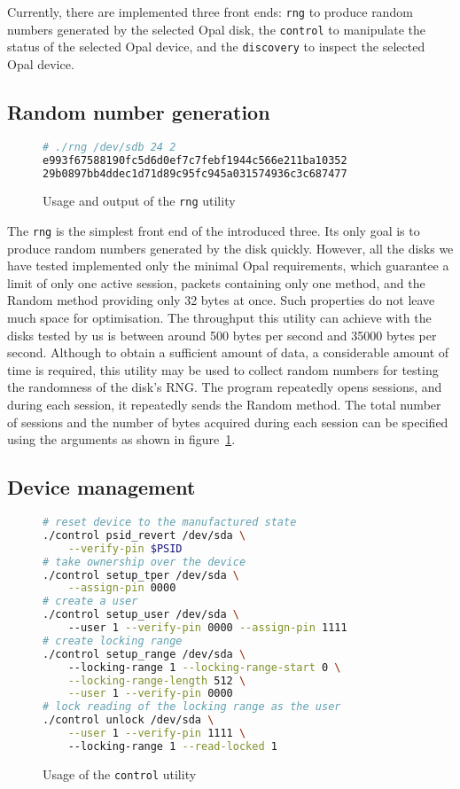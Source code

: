 Currently, there are implemented three front ends: \verb|rng| to produce random numbers generated by the selected Opal disk, the \verb|control| to manipulate the status of the selected Opal device, and the \verb|discovery| to inspect the selected Opal device.

\subsection{Random number generation}

\begin{figure}
    \centering
\begin{lstlisting}[language=Bash]
# ./rng /dev/sdb 24 2
e993f67588190fc5d6d0ef7c7febf1944c566e211ba10352
29b0897bb4ddec1d71d89c95fc945a031574936c3c687477
\end{lstlisting}
    \caption{Usage and output of the \texttt{rng} utility}
    \label{fig:rng_output}
\end{figure}

The \verb|rng| is the simplest front end of the introduced three. Its only goal is to produce random numbers generated by the disk quickly. However, all the disks we have tested implemented only the minimal Opal requirements, which guarantee a limit of only one active session, packets containing only one method, and the Random method providing only 32 bytes at once. Such properties do not leave much space for optimisation. The throughput this utility can achieve with the disks tested by us is between around 500 bytes per second and 35000 bytes per second. Although to obtain a sufficient amount of data, a considerable amount of time is required, this utility may be used to collect random numbers for testing the randomness of the disk's RNG.
The program repeatedly opens sessions, and during each session, it repeatedly sends the Random method. The total number of sessions and the number of bytes acquired during each session can be specified using the arguments as shown in figure~\ref{fig:rng_output}.

\subsection{Device management}

\begin{figure}
    \centering
    \begin{lstlisting}[language=bash]
# reset device to the manufactured state
./control psid_revert /dev/sda \
    --verify-pin $PSID
# take ownership over the device
./control setup_tper /dev/sda \
    --assign-pin 0000
# create a user
./control setup_user /dev/sda \ 
    --user 1 --verify-pin 0000 --assign-pin 1111
# create locking range
./control setup_range /dev/sda \ 
    --locking-range 1 --locking-range-start 0 \
    --locking-range-length 512 \
    --user 1 --verify-pin 0000
# lock reading of the locking range as the user
./control unlock /dev/sda \
    --user 1 --verify-pin 1111 \ 
    --locking-range 1 --read-locked 1
    \end{lstlisting}
    \caption{Usage of the \texttt{control} utility}
    \label{fig:control_output}
\end{figure}

